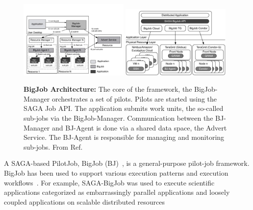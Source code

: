 \documentclass[]{svjour3}
\begin{document}
\begin{figure}[t]
 \centering
  \includegraphics[width=0.48\textwidth]{figures/re_bigjob_interactions.pdf}
 \includegraphics[width=0.48\textwidth]{figures/distributed_pilot_job.pdf}

    \caption{\textbf{BigJob Architecture:} The core of the
     framework, the BigJob-Manager orchestrates a set of
     pilots. Pilots are started using the SAGA Job API. The
     application submits work units, the so-called sub-jobs via the
     BigJob-Manager. Communication between the BJ-Manager and
     BJ-Agent is done via a shared data space, the Advert
     Service. The BJ-Agent is responsible for managing and
     monitoring sub-jobs. From
     Ref.~\cite{saga_bigjob_condor_cloud}}
    \label{fig:figures_re_bigjob_interactions}
\end{figure}

A SAGA-based PilotJob, BigJob
(BJ)~\cite{bigjob_web,saga_bigjob_condor_cloud}, is a general-purpose
pilot-job framework. BigJob has been used to support various execution
patterns and execution workflows~\cite{async_repex11,saga-royalsoc}.
For example, SAGA-BigJob was used to execute scientific applications
categorized as embarrassingly parallel applications and loosely
coupled applications on scalable distributed
resources~\cite{ecmls_ccpe10, dare-ecmls11}
\end{document}
